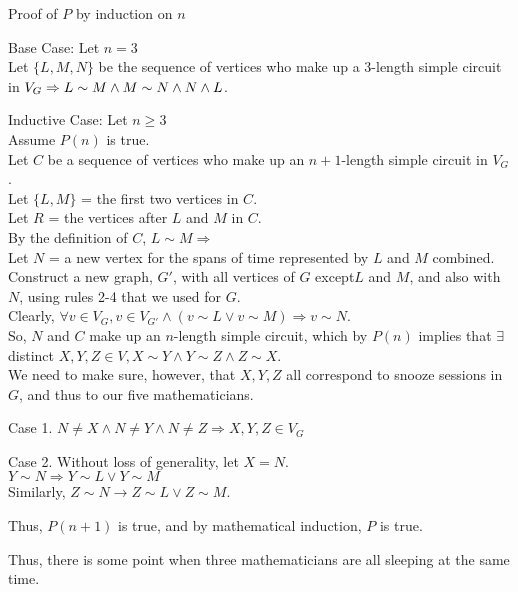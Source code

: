 \documentclass[fleqn]{article}
\begin{document}
Proof of $P$ by induction on $n$

Base Case: Let $n = 3$\\
Let $\lbrace L, M, N \rbrace$ be the sequence of vertices who make up a 3-length simple circuit in $V_G \Rightarrow\\
L \sim M \wedge M \sim N \wedge N \wedge L$.

Inductive Case: Let $n \geq 3$\\
Assume $P(n)$ is true.\\
Let $C$ be a sequence of vertices who make up an $n+1$-length simple circuit in $V_G$.\\
Let $\lbrace L,M \rbrace$ = the first two vertices in $C$.\\
Let $R$ = the vertices after $L$ and $M$ in $C$.\\
By the definition of $C$, $L \sim M \Rightarrow$\\
Let $N$ = a new vertex for the spans of time represented by $L$ and $M$ combined.\\
Construct a new graph, $G'$, with all vertices of $G$ except$L$ and $M$, and also with $N$, using rules 2-4 that we used for $G$.\\
Clearly, $\forall v \in V_G, v \in V_{G'} \wedge (v \sim L \vee v \sim M)
          \Rightarrow v \sim N$.\\
So, $N$ and $C$ make up an $n$-length simple circuit, which by $P(n)$ implies that $\exists$ distinct $X,Y,Z \in V,
              X \sim Y \wedge Y \sim Z \wedge Z \sim X$.\\
We need to make sure, however, that $X,Y,Z$ all correspond to snooze sessions in $G$, and thus to our five mathematicians.

Case 1. $N \not= X \wedge N \not= Y \wedge N \not= Z \Rightarrow
        X,Y,Z \in V_G$

Case 2. Without loss of generality, let $X = N$.\\
        $Y \sim N \Rightarrow Y \sim L \vee Y \sim M$\\
        Similarly, $Z \sim N \rightarrow Z \sim L \vee Z \sim M$.

Thus, $P(n+1)$ is true, and by mathematical induction, $P$ is true.

Thus, there is some point when three mathematicians are all sleeping at the same time.
\end{document}
